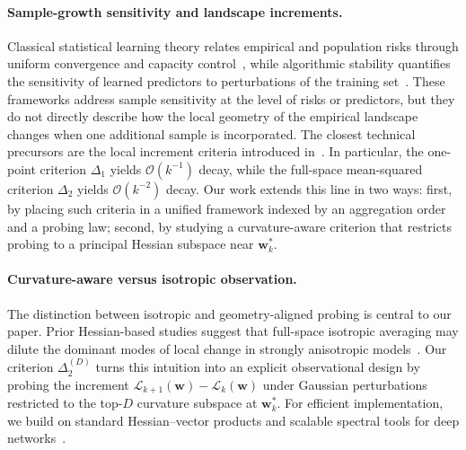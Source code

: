 \documentclass[10pt]{article}
\theoremstyle{plain}
\theoremstyle{remark}
\begin{document}
\paragraph{Sample-growth sensitivity and landscape increments.}
Classical statistical learning theory relates empirical and population risks through uniform convergence and capacity control~\citep{vapnik1998statistical,shalev2014understanding}, while algorithmic stability quantifies the sensitivity of learned predictors to perturbations of the training set~\citep{bousquet2002stability,feldman2019high,bousquet2020sharper}.
These frameworks address sample sensitivity at the level of risks or predictors, but they do not directly describe how the local geometry of the empirical landscape changes when one additional sample is incorporated.
The closest technical precursors are the local increment criteria introduced in~\citet{author:delta1,author:delta2}.
In particular, the one-point criterion $\Delta_1$ yields $\mathcal O(k^{-1})$ decay, while the full-space mean-squared criterion $\Delta_2$ yields $\mathcal O(k^{-2})$ decay.
Our work extends this line in two ways: first, by placing such criteria in a unified framework indexed by an aggregation order and a probing law; second, by studying a curvature-aware criterion that restricts probing to a principal Hessian subspace near $\mathbf w_k^*$.

\paragraph{Curvature-aware versus isotropic observation.}
The distinction between isotropic and geometry-aligned probing is central to our paper.
Prior Hessian-based studies suggest that full-space isotropic averaging may dilute the dominant modes of local change in strongly anisotropic models~\citep{sagun2017hessian,ghorbani2019investigation,wu2021dissecting}.
Our criterion $\Delta_2^{(D)}$ turns this intuition into an explicit observational design by probing the increment $\mathcal L_{k+1}(\mathbf{w}) - \mathcal L_k(\mathbf{w})$ under Gaussian perturbations restricted to the top-$D$ curvature subspace at $\mathbf w_k^*$.
For efficient implementation, we build on standard Hessian--vector products and scalable spectral tools for deep networks~\citep{pearlmutter1994fast,yao2020pyhessian}.
\end{document}

